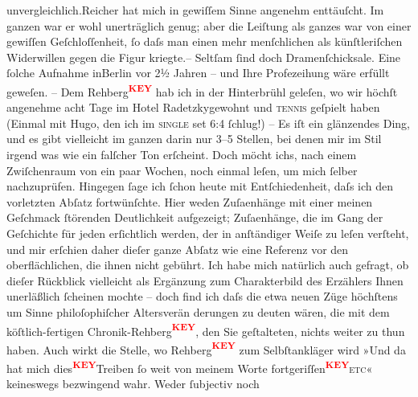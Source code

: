 \begin{ledgroupsized}[t]{13cm}
                  unvergleichlich.Reicher hat mich in
               gewiſſem Sinne angenehm enttäuſcht. Im ganzen war er wohl unerträglich genug; aber
               die Leiſtung als ganzes war von einer gewiſſen Geſchloſſenheit, ſo daſs man einen
               mehr menſchlichen als künſtleriſchen Widerwillen gegen die Figur kriegte.– Seltſam
               ſind doch Dramenſchicksale. Eine ſolche Aufnahme inBerlin vor 2½ Jahren – und Ihre Profezeihung wäre erfüllt geweſen. – Dem Rehberg\textcolor{red}{\textsuperscript{\textbf{KEY}}} hab ich in der Hinterbrühl geleſen, wo wir höchſt angenehme acht Tage im Hotel Radetzkygewohnt und \textsc{tennis} geſpielt haben (Einmal mit Hugo, den ich im \textsc{single} set 6:4 ſchlug!) – Es iſt
               ein glänzendes Ding, und es gibt vielleicht im ganzen darin nur 3–5 Stellen, bei
               denen mir im Stil irgend was wie ein falſcher Ton erſcheint. Doch möcht ichs, nach
               einem Zwiſchenraum von ein paar Wochen, noch einmal leſen, um mich ſelber
               nachzuprüfen. Hingegen ſage ich ſchon heute mit Entſchiedenheit, daſs ich den
               vorletzten Abſatz fortwünſchte. Hier weden Zuſa{\geminationm}enhänge
               mit einer meinen Geſchmack ſtörenden Deutlichkeit aufgezeigt; Zuſa{\geminationm}enhänge, die im
               {\pb}Gang der Geſchichte  für jeden erſichtlich werden, der in
               anſtändiger Weiſe zu leſen verſteht, und mir erſchien daher dieſer ganze Abſatz wie
               eine Referenz vor den oberflächlichen, die ihnen nicht gebührt. Ich habe mich
               natürlich auch gefragt, ob dieſer Rückblick vielleicht als Ergänzung zum
               Charakterbild des Erzählers Ihnen unerläßlich ſcheinen mochte – doch find ich daſs
               die etwa neuen Züge höchſtens um Sinne philoſophiſcher Altersverän derungen zu deuten
               wären, die mit dem köſtlich-fertigen Chronik-Rehberg\textcolor{red}{\textsuperscript{\textbf{KEY}}}, den
               Sie geſtalteten, nichts weiter zu thun haben. Auch wirkt {\pb}die Stelle, wo Rehberg\textcolor{red}{\textsuperscript{\textbf{KEY}}} zum Selbſtankläger wird »Und da{\geminationn} hat mich dies\textcolor{red}{\textsuperscript{\textbf{KEY}}}Treiben ſo weit von meinem Worte fortgeriſſen\textcolor{red}{\textsuperscript{\textbf{KEY}}}\textsc{etc}« keineswegs bezwingend wahr. Weder ſubjectiv noch

\end{ledgroupsized}

